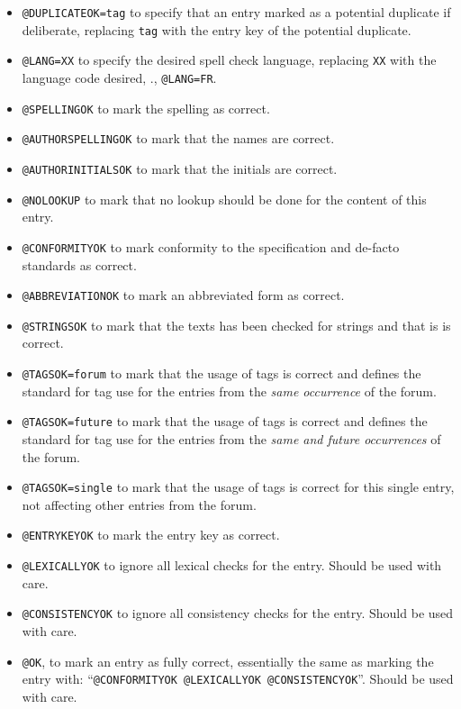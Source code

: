 \begin{itemize}
\item \texttt{@DUPLICATEOK=tag} to specify that an entry marked as a
  potential duplicate if deliberate, replacing \texttt{tag} with the
  entry key of the potential duplicate.
\item \texttt{@LANG=XX} to specify the desired spell check language,
  replacing \texttt{XX} with the language code desired, \eg.,
  \texttt{@LANG=FR}.
\item \texttt{@SPELLINGOK} to mark the spelling as correct.
\item \texttt{@AUTHORSPELLINGOK} to mark that the names are correct.
\item \texttt{@AUTHORINITIALSOK} to mark that the initials are correct.
\item \texttt{@NOLOOKUP} to mark that no lookup should be done for
  the content of this entry.
\item \texttt{@CONFORMITYOK} to mark conformity to the specification
  and de-facto standards as correct.
\item \texttt{@ABBREVIATIONOK} to mark an abbreviated form as correct.
\item \texttt{@STRINGSOK} to mark that the texts has been checked for
  strings and that is is correct.
\item \texttt{@TAGSOK=forum} to mark that the usage of tags is correct and
  defines the standard for tag use for the entries from the \emph{same
  occurrence} of the forum.
\item \texttt{@TAGSOK=future} to mark that the usage of tags is
  correct and defines the standard for tag use for the entries from
  the \emph{same and future occurrences} of the forum.
\item \texttt{@TAGSOK=single} to mark that the usage of tags is
  correct for this single entry, not affecting other entries from the
  forum.
\item \texttt{@ENTRYKEYOK} to mark the entry key as correct.
\item \texttt{@LEXICALLYOK} to ignore all lexical checks for the
  entry.  Should be used with care.
\item \texttt{@CONSISTENCYOK} to ignore all consistency checks for the
  entry.  Should be used with care.
\item \texttt{@OK}, to mark an entry as fully correct, essentially the
  same as marking the entry with: ``\texttt{@CONFORMITYOK @LEXICALLYOK
    @CONSISTENCYOK}''.  Should be used with care.
\end{itemize}

